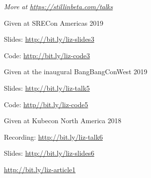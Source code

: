 \documentclass[letterpaper,11pt,notitlepage]{article}
\begin{document}
      {\it More at \url{https://stillinbeta.com/talks}} \\
      \begin{employment}
          \item Given at SRECon Americas 2019
          \item Slides: \url{http://bit.ly/liz-slides3}
          \item Code: \url{http://bit.ly/liz-code3}
      \end{employment}
      \begin{employment}
        \item Given at the inaugural BangBangConWest 2019
        \item Slides: \url{http://bit.ly/liz-talk5}
        \item Code: \url{http//bit.ly/liz-code5}
      \end{employment}
      \begin{employment}
        \item Given at Kubecon North America 2018
        \item Recording: \url{http://bit.ly/liz-talk6}
        \item Slides: \url{http://bit.ly/liz-slides6}
      \end{employment}

\vbar
{}
     \begin{employment}
       
       \item \url{http://bit.ly/liz-article1}
       \end{employment}
\end{document}

